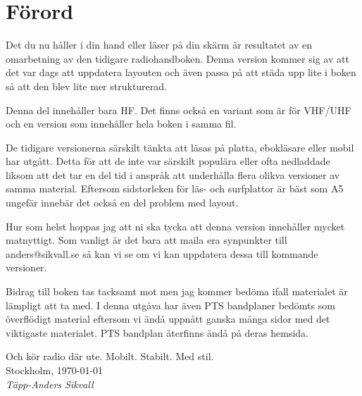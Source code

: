 \section*{Förord}

Det du nu håller i din hand eller läser på din skärm är resultatet av en omarbetning av den tidigare radiohandboken. Denna version kommer sig av att det var dags att uppdatera layouten och även passa på att städa upp lite i boken så att den blev lite mer strukturerad.

Denna del innehåller bara HF. Det finns också en variant som är för VHF/UHF och en version som innehåller hela boken i samma fil.

De tidigare versionerna särskilt tänkta att läsas på platta, ebokläsare eller mobil har utgått. Detta för att de inte var särskilt populära eller ofta nedladdade liksom att det tar en del tid i anspråk att underhålla flera olikva versioner av samma material. Eftersom sidstorleken för läs- och surfplattor är bäst som A5 ungefär innebär det också en del problem med layout.

Hur som helst hoppas jag att ni ska tycka att denna version innehåller mycket matnyttigt. Som vanligt är det bara att maila era synpunkter till anders@sikvall.se så kan vi se om vi kan uppdatera dessa till kommande versioner.

Bidrag till boken tas tacksamt mot men jag kommer bedöma ifall materialet är lämpligt att ta med. I denna utgåva har även PTS bandplaner bedömts som överflödigt material eftersom vi ändå uppnått ganska många sidor med det viktigaste materialet. PTS bandplan återfinns ändå på deras hemsida.

Och kör radio där ute. Mobilt. Stabilt. Med stil.\\[4em]

Stockholm, \today\\
\textit{Täpp-Anders Sikvall}

\clearpage
